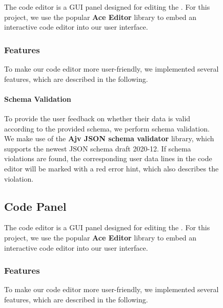 \begin{figure}[h]
The code editor is a GUI panel designed for editing the \cfgfiles.
For this project, we use the popular \textbf{Ace Editor}\cite{Ace-Editor} library to embed an interactive code editor into our user interface.

\subsubsection{Features}

To make our code editor more user-friendly, we implemented several features, which are described in the following.

\paragraph{Schema Validation}
To provide the user feedback on whether their data is valid according to the provided schema, we perform schema validation.
We make use of the \textbf{Ajv JSON schema validator}\cite{ajv-validator} library, which supports the newest JSON schema draft 2020-12.
If schema violations are found, the corresponding user data lines in the code editor will be marked with a red error hint, which also describes the violation.


\subsection{Code Panel}\label{subsec:code-editor}

The code editor is a GUI panel designed for editing the \cfgfiles.
For this project, we use the popular \textbf{Ace Editor}\cite{Ace-Editor} library to embed an interactive code editor into our user interface.

\subsubsection{Features}

To make our code editor more user-friendly, we implemented several features, which are described in the following.


\end{figure}
